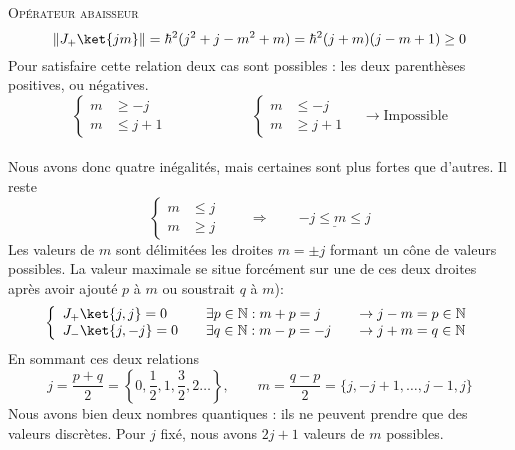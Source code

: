 	
	\textsc{Opérateur abaisseur}
	\begin{equation}
	\|J_+\ket{jm}\| = \hbar^2(j^2+j-m^2+m) = \hbar^2(j+m)(j-m+1)\geq 0
	\end{equation}
	Pour satisfaire cette relation deux cas sont possibles : les deux parenthèses positives, ou négatives.
	\begin{equation}
	\left\{\begin{array}{ll}
	m &\geq -j\\
	m &\leq j+1
	\end{array}\right.\qquad\qquad\qquad		\left\{\begin{array}{ll}
	m &\leq -j\\
	m &\geq j+1
	\end{array}\right.\quad\rightarrow \text{Impossible}
	\end{equation}\ \\
	
	Nous avons donc quatre inégalités, mais certaines sont plus fortes que d'autres. Il reste
	\begin{equation}
	\left\{\begin{array}{ll}
	m &\leq j\\
	m &\geq j
	\end{array}\right.\qquad\Longrightarrow\qquad \underline{-j\leq m\leq j}
	\end{equation}
	Les valeurs de $m$ sont délimitées les droites $m=\pm j$ formant un cône de valeurs possibles. 
	La valeur maximale se situe forcément sur une de ces deux droites après avoir ajouté $p$ à $m$ 
	ou soustrait $q$ à $m$):
	\begin{equation}
	\left\{\begin{array}{llll}
	J_+\ket{j,j} = 0 & \quad \exists p\in\mathbb{N} : m+p=j &\quad \rightarrow j-m=p\in\mathbb{N}\\
	J_-\ket{j,-j} = 0 & \quad \exists q\in\mathbb{N} : m-p=-j &\quad \rightarrow j+m=q\in\mathbb{N}	
	\end{array}\right.
	\end{equation}
	En sommant ces deux relations
	\begin{equation}
	j = \frac{p+q}{2} = \left\{0,\frac{1}{2},1,\frac{3}{2},2\dots\right\},\qquad
	m = \frac{q-p}{2} = \{j,-j+1,\dots, j-1,j\}
	\end{equation}
	Nous avons bien deux nombres quantiques : ils ne peuvent prendre que des valeurs discrètes. Pour
	$j$ fixé, nous avons $2j+1$ valeurs de $m$ possibles. \\
	
